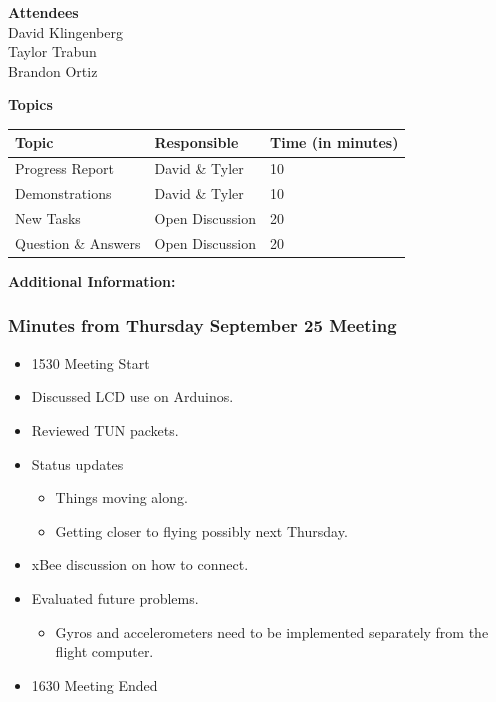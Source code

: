 \documentclass[pdftex,11pt]{article}
\begin{document}
{ \large \bfseries \hspace*{2 mm} Attendees\\}
\hspace*{12mm} David Klingenberg\\
\hspace*{12mm} Taylor Trabun\\
\hspace*{12mm} Brandon Ortiz\\
\vspace*{1.5mm}

{ \large \bfseries \noindent Topics}
\vspace*{2.5mm}

\begin{tabular}{| l | l | l |}
  \hline
  \bfseries Topic & \bfseries Responsible & \bfseries Time (in minutes) \\ \hline
  Progress Report  & David \& Tyler &  10 \\ \hline
  Demonstrations & David \& Tyler & 10 \\ \hline
  New Tasks & Open Discussion & 20 \\ \hline
  Question \&  Answers  & Open Discussion & 20 \\ 
  \hline
\end{tabular}

\vspace*{2.5mm}
{ \large \bfseries \noindent Additional Information:}

\subsubsection[short]{Minutes from Thursday September 25 Meeting}
\begin{itemize}
	\item 1530 \indent Meeting Start
	\item Discussed LCD use on Arduinos.
	\item Reviewed TUN  packets.
	\item  Status updates
	\begin{itemize}
		\item Things moving along.
		\item Getting closer to flying possibly  next Thursday.
	\end{itemize}
	\item xBee discussion on how to connect.
	\item Evaluated future problems.
	\begin{itemize}
		\item  Gyros and accelerometers need to be implemented separately from the flight computer.
	\end{itemize}
	\item 1630 \indent Meeting Ended
\end{itemize}	
\end{document}
